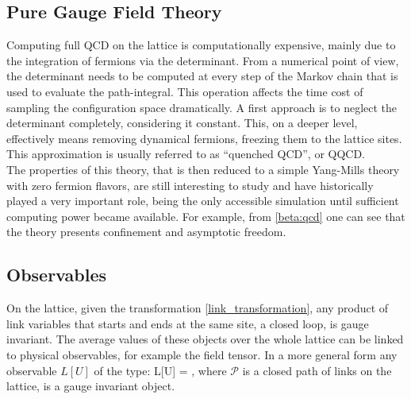 \subsection{Pure Gauge Field Theory}
Computing full QCD on the lattice is computationally expensive, mainly due to the integration of fermions via the determinant. From a numerical point of view, the determinant needs to be computed at every step of the Markov chain that is used to evaluate the path-integral. This operation affects the time cost of sampling the configuration space dramatically. A first approach is to neglect the determinant completely, considering it constant. This, on a deeper level, effectively means removing dynamical fermions, freezing them to the lattice sites. This approximation is usually referred to as ``quenched QCD'', or QQCD. \\
The properties of this theory, that is then reduced to a simple Yang-Mills theory with zero fermion flavors, are still interesting to study and have historically played a very important role, being the only accessible simulation until sufficient computing power became available. For example, from \cref{beta:qcd} one can see that the theory presents confinement and asymptotic freedom. 

\subsection{Observables}
\label{sec:observables}
On the lattice, given the transformation \cref{link_transformation}, any product of link variables that starts and ends at the same site, a closed loop, is gauge invariant. The average values of these objects over the whole lattice can be linked to physical observables, for example the field tensor. In a more general form any observable $L[U]$ of the type:
\beq
    L[U] = \Tr {},
\eeq
where $\mathcal{P}$ is a closed path of links on the lattice, is a gauge invariant object.

